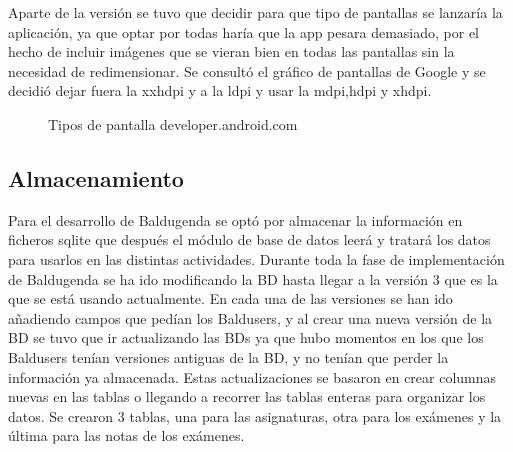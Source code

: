 Aparte de la versión se tuvo que decidir para que tipo de pantallas se lanzaría la aplicación, ya que optar por todas haría que la app pesara demasiado, por el hecho de incluir imágenes que se vieran bien en todas las pantallas sin la necesidad de redimensionar.
Se consultó el gráfico de pantallas de Google y se decidió dejar fuera la xxhdpi y a la ldpi y usar la mdpi,hdpi y xhdpi.

\begin{figure}[H] 
  \begin{center} 
    \caption{Tipos de pantalla developer.android.com} 
    \label{fig:TiposPantalla} 
  \end{center} 
\end{figure}

\subsection{Almacenamiento}
\label{subsecc:Almacenamiento}

Para el desarrollo de Baldugenda se optó por almacenar la información en ficheros sqlite que después el módulo de base de datos leerá y tratará los datos para usarlos en las distintas actividades.
Durante toda la fase de implementación de Baldugenda se ha ido modificando la BD hasta llegar a la versión 3 que es la que se está usando actualmente.
En cada una de las versiones se han ido añadiendo campos que pedían los Baldusers, y al crear una nueva versión de la BD se tuvo que ir actualizando las BDs ya que hubo momentos en los que los Baldusers tenían versiones antiguas de la BD, y no tenían que perder la información ya almacenada.
Estas actualizaciones se basaron en crear columnas nuevas en las tablas o llegando a recorrer las tablas enteras para organizar los datos.
Se crearon 3 tablas, una para las asignaturas, otra para los exámenes y la última para las notas de los exámenes.


